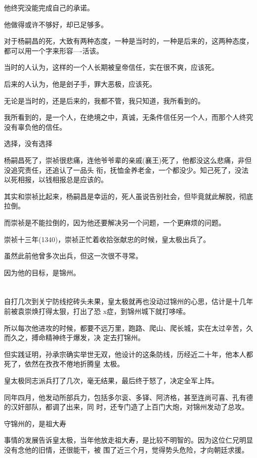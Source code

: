 \documentclass[11pt,a4paper,onecolumn]{article}
\begin{document}
他终究没能完成自己的承诺。

他做得或许不够好，却已足够多。

对于杨嗣昌的死，大致有两种态度，一种是当时的，一种是后来的，这两种态度，都可以用一个字来形容----活该。

当时的人认为，这样的一个人长期被皇帝信任，实在很不爽，应该死。

后来的人认为，他是刽子手，罪大恶极，应该死。

无论是当时的，还是后来的，我都不管，我只知道，我所看到的。

我所看到的，是一个人，在绝境之中，真诚，无条件信任另一个人，而那个人终究没有辜负他的信任。

选择，没有选择

杨嗣昌死了，崇祯很悲痛，连他爷爷辈的亲戚(襄王)死了，他都没这么悲痛，非但没追究责任，还追认了一品头
衔，抚恤金养老金，一个都没少。知己死了，没法以死相报，以钱相报总是应该的。

其实和崇祯比起来，杨嗣昌是幸运的，死人虽说告别社会，但毕竟就此解脱，彻底拉倒。

而崇祯是不能拉倒的，因为他还要解决另一个问题，一个更麻烦的问题。

崇祯十三年(1340)，崇祯正忙着收拾张献忠的时候，皇太极出兵了。

虽然此前他曾多次出兵，但这一次很不寻常。

因为他的目标，是锦州。

\section[\thesection]{}

自打几次到关宁防线挖砖头未果，皇太极就再也没动过锦州的心思，估计是十几年前被袁崇焕打得太狠，打出了恐
x症，到锦州城下就打哆嗦。

所以每次他进攻的时候，都要不远万里，跑路、爬山、爬长城，实在太过辛苦，久而久之，搏命精神终于爆发，决
定去打锦州。

但实践证明，孙承宗确实举世无双，他设计的这条防线，历经近二十年，他本人都死了，依然在孜孜不倦地折腾皇
太极。

皇太极同志派兵打了几次，毫无结果，最后终于怒了，决定全军上阵。

同年四月，他发动所部兵力，包括多尔衮、多铎、阿济格，甚至连尚可喜、孔有德的汉奸部队，都调了出来，同
时，还专门造了上百门大炮，对锦州发动了总攻。

守锦州的，是祖大寿

事情的发展告诉皇太极，当年他放走祖大寿，是比较不明智的。因为这位仁兄明显没有念他的旧情，还很能干，被
围了近三个月，觉得势头危险，才向朝廷求援。
\end{document}
